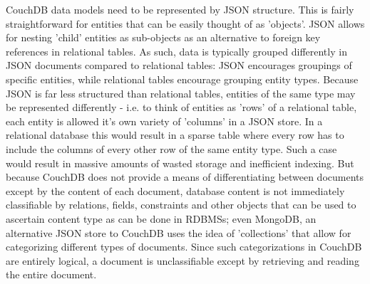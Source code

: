 CouchDB data models need to be represented by JSON structure. This is fairly straightforward for entities that can be easily thought of as 'objects'. JSON allows for nesting 'child' entities as sub-objects as an alternative to foreign key references in relational tables. As such, data is typically grouped differently in JSON documents compared to relational tables: JSON encourages groupings of specific entities, while relational tables encourage grouping entity types. Because JSON is far less structured than relational tables, entities of the same type may be represented differently - i.e. to think of entities as 'rows' of a relational table, each entity is allowed it's own variety of 'columns' in a JSON store. In a relational database this would result in a sparse table where every row has to include the columns of every other row of the same entity type. Such a case would result in massive amounts of wasted storage and inefficient indexing. But because CouchDB does not provide a means of differentiating between documents except by the content of each document, database content is not immediately classifiable by relations, fields, constraints and other objects that can be used to ascertain content type as can be done in RDBMSs; even MongoDB, an alternative JSON store to CouchDB uses the idea of 'collections' that allow for categorizing different types of documents. Since such categorizations in CouchDB are entirely logical, a document is unclassifiable except by retrieving and reading the entire document.